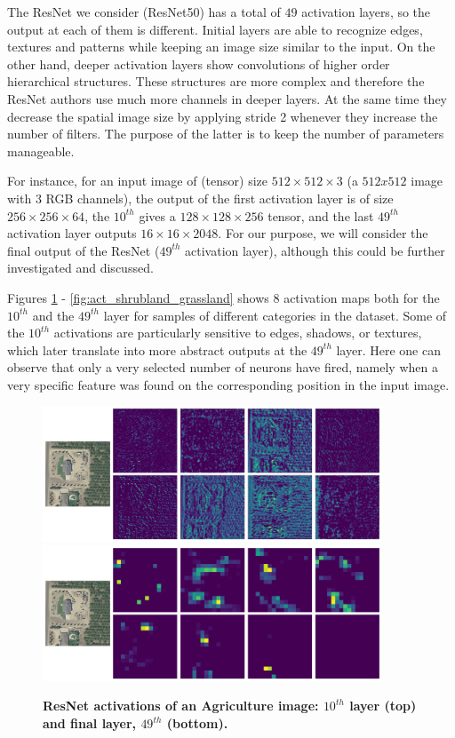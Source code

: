 The ResNet we consider (ResNet50) has a total of $49$ activation layers, so the output at each of them is different. Initial layers are able to recognize edges, textures and patterns while keeping an image size similar to the input. On the other hand, deeper activation layers show convolutions of higher order hierarchical structures. These structures are more complex and therefore the ResNet authors use much more channels in deeper layers. At the same time they decrease the spatial image size by applying stride 2 whenever they increase the number of filters. The purpose of the latter is to keep the number of parameters manageable.  

For instance, for an input image of (tensor) size $512 \times 512 \times 3$ (a $512x512$ image with $3$ RGB channels), the output of the first activation layer is of size $256 \times 256 \times 64$, the $10^{th}$ gives a $128 \times 128 \times 256$ tensor, and the last $49^{th}$ activation layer outputs $16 \times 16 \times 2048$. For our purpose, we will consider the final output of the ResNet ($49^{th}$ activation layer), although this could be further investigated and discussed.

Figures \ref{fig:act_agriculture} - \ref{fig:act_shrubland_grassland} shows 8 activation maps both for the $10^{th}$ and the $49^{th}$ layer for samples of different categories in the dataset. Some of the $10^{th}$ activations are particularly sensitive to edges, shadows, or textures, which later translate into more abstract outputs at the $49^{th}$ layer. Here one can observe that only a very selected number of neurons have fired, namely when a very specific feature was found on the corresponding position in the input image.

\begin{figure}[H]
	\centering
	\includegraphics[width=0.9\textwidth]{Figures/activations/agriculture_l2_s1_activation_10.png}
	\includegraphics[width=0.9\textwidth]{Figures/activations/agriculture_l2_s1_activation_49.png}
	\captionsetup{width=1\linewidth}
	\caption{\textbf{ResNet activations of an Agriculture image: $10^{th}$ layer (top) and final layer, $49^{th}$ (bottom).}}
	\label{fig:act_agriculture}
\end{figure}


